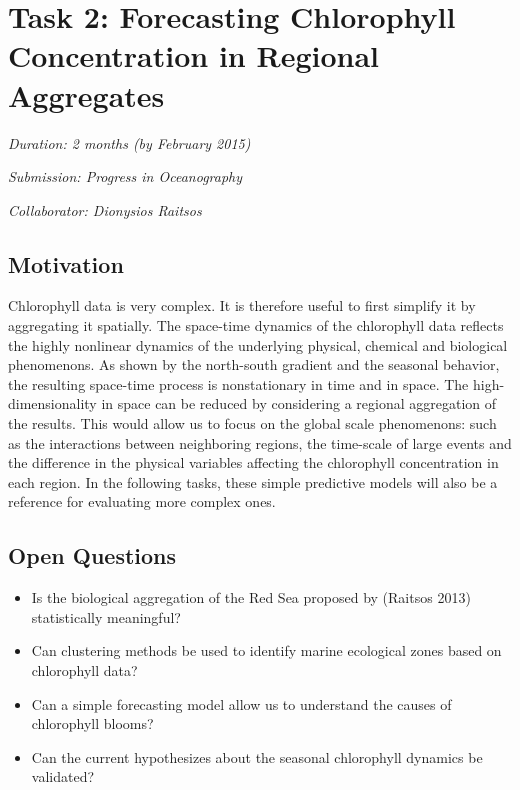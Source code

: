 \section{Task 2:  Forecasting Chlorophyll Concentration in Regional Aggregates}

\noindent
\emph{Duration: 2 months (by February 2015)}

\noindent
\emph{Submission: Progress in Oceanography}

\noindent
\emph{Collaborator: Dionysios Raitsos}

\subsection{Motivation}

Chlorophyll data is very complex. It is therefore useful to first simplify it by aggregating it spatially. The space-time dynamics of the chlorophyll data reflects the highly nonlinear dynamics of the underlying physical, chemical and biological phenomenons. As shown by the north-south gradient and the seasonal behavior, the resulting space-time process is nonstationary in time and in space. The high-dimensionality in space can be reduced by considering a regional aggregation of the results. This would allow us to focus on the global scale phenomenons: such as the interactions between neighboring regions, the time-scale of large events and the difference in the physical variables affecting the chlorophyll concentration in each region. In the following tasks, these simple predictive models will also be a reference for evaluating more complex ones. 

\subsection{Open Questions}

\begin{itemize}
\item Is the biological aggregation of the Red Sea proposed by (Raitsos 2013) statistically meaningful?
\item Can clustering methods be used to identify marine ecological zones based on chlorophyll data?
\item Can a simple forecasting model allow us to understand the causes of chlorophyll blooms?
\item Can the current hypothesizes about the seasonal chlorophyll dynamics be validated?
\end{itemize}

